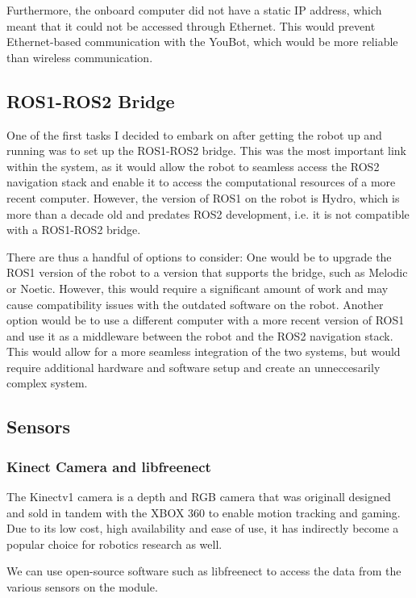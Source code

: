 \documentclass[a4paper, 12pt]{article}
\begin{document}
    Furthermore, the onboard computer did not have a static IP address, which meant that it could not be accessed through Ethernet. This would prevent Ethernet-based communication with the YouBot, which would be more reliable than wireless communication. 


    \subsection{ROS1-ROS2 Bridge}

    One of the first tasks I decided to embark on after getting the robot up and running was to set up the ROS1-ROS2 bridge. This was the most important link within the system, as it would allow the robot to seamless access the ROS2 navigation stack and enable it to access the computational resources of a more recent computer. However, the version of ROS1 on the robot is Hydro, which is more than a decade old and predates ROS2 development, i.e. it is not compatible with a ROS1-ROS2 bridge. 
 
    There are thus a handful of options to consider: One would be to upgrade the ROS1 version of the robot to a version that supports the bridge, such as Melodic or Noetic. However, this would require a significant amount of work and may cause compatibility issues with the outdated software on the robot. Another option would be to use a different computer with a more recent version of ROS1 and use it as a middleware between the robot and the ROS2 navigation stack. This would allow for a more seamless integration of the two systems, but would require additional hardware and software setup and create an unneccesarily complex system. 

    
    \subsection{Sensors}
    \subsubsection{Kinect Camera and libfreenect}

    The Kinectv1 camera is a depth and RGB camera that was originall designed and sold in tandem with the XBOX 360 to enable motion tracking and gaming. Due to its low cost, high availability and ease of use, it has indirectly become a popular choice for robotics research as well. 

    We can use open-source software such as libfreenect to access the data from the various sensors on the module.
\end{document}
